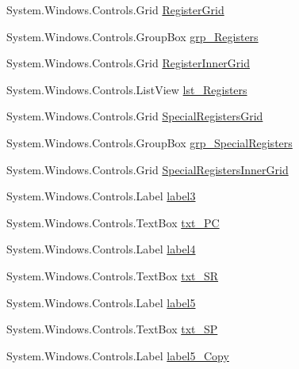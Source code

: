 \begin{DoxyCompactItemize}
\item 
System.\+Windows.\+Controls.\+Grid \hyperlink{class_c_p_u___o_s___simulator_1_1_main_window_a37acb139db0aa54950350fdb47dfd452}{Register\+Grid}
\item 
System.\+Windows.\+Controls.\+Group\+Box \hyperlink{class_c_p_u___o_s___simulator_1_1_main_window_af858add509dfe2b90f0d356822f73737}{grp\+\_\+\+Registers}
\item 
System.\+Windows.\+Controls.\+Grid \hyperlink{class_c_p_u___o_s___simulator_1_1_main_window_a27d2d9e2ed92e2daa444ca8086a0861e}{Register\+Inner\+Grid}
\item 
System.\+Windows.\+Controls.\+List\+View \hyperlink{class_c_p_u___o_s___simulator_1_1_main_window_ae88013c536662328670f206a4cab99b1}{lst\+\_\+\+Registers}
\item 
System.\+Windows.\+Controls.\+Grid \hyperlink{class_c_p_u___o_s___simulator_1_1_main_window_a7ce98e44f9236ca31eb5bf3ed81c3372}{Special\+Registers\+Grid}
\item 
System.\+Windows.\+Controls.\+Group\+Box \hyperlink{class_c_p_u___o_s___simulator_1_1_main_window_a02e4a81d8689928cb1d459fd3c01bfdf}{grp\+\_\+\+Special\+Registers}
\item 
System.\+Windows.\+Controls.\+Grid \hyperlink{class_c_p_u___o_s___simulator_1_1_main_window_aeef1e97d3e7d589fdab51828260c7b5a}{Special\+Registers\+Inner\+Grid}
\item 
System.\+Windows.\+Controls.\+Label \hyperlink{class_c_p_u___o_s___simulator_1_1_main_window_a94cf4fbdaebb09776745893c2bce1126}{label3}
\item 
System.\+Windows.\+Controls.\+Text\+Box \hyperlink{class_c_p_u___o_s___simulator_1_1_main_window_a7100765f8e26fa4c97a76dd445942b97}{txt\+\_\+\+P\+C}
\item 
System.\+Windows.\+Controls.\+Label \hyperlink{class_c_p_u___o_s___simulator_1_1_main_window_a3473dc873d8c8d8f4bba6e83f5684299}{label4}
\item 
System.\+Windows.\+Controls.\+Text\+Box \hyperlink{class_c_p_u___o_s___simulator_1_1_main_window_a9135c01bacd48e517d7cf46f69ea87d2}{txt\+\_\+\+S\+R}
\item 
System.\+Windows.\+Controls.\+Label \hyperlink{class_c_p_u___o_s___simulator_1_1_main_window_a37b18e7542e985a8984375d0b1cf441e}{label5}
\item 
System.\+Windows.\+Controls.\+Text\+Box \hyperlink{class_c_p_u___o_s___simulator_1_1_main_window_ac2427655774b9ca2b4c368651d5cd9de}{txt\+\_\+\+S\+P}
\item 
System.\+Windows.\+Controls.\+Label \hyperlink{class_c_p_u___o_s___simulator_1_1_main_window_aadfe7782d7e25b730849222805a541f9}{label5\+\_\+\+Copy}

\end{DoxyCompactItemize}
